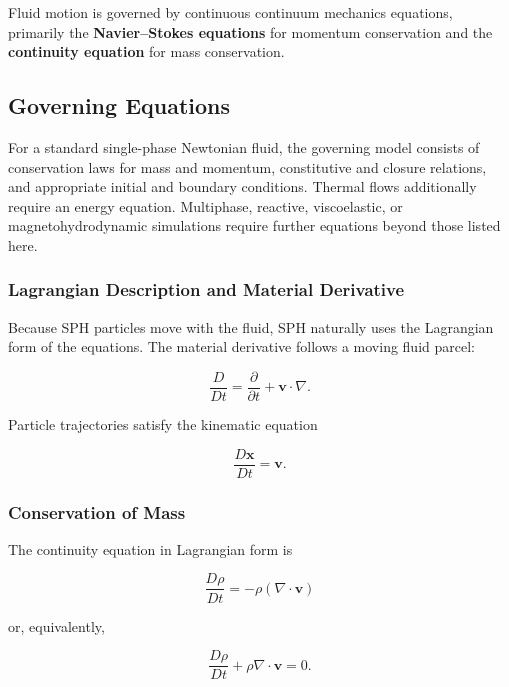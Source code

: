\documentclass[11pt]{article}
\begin{document}
Fluid motion is governed by continuous continuum mechanics equations, primarily
the \textbf{Navier--Stokes equations} for momentum conservation and the
\textbf{continuity equation} for mass conservation.

\subsection{Governing Equations}

For a standard single-phase Newtonian fluid, the governing model consists of
conservation laws for mass and momentum, constitutive and closure relations,
and appropriate initial and boundary conditions. Thermal flows additionally
require an energy equation. Multiphase, reactive, viscoelastic, or
magnetohydrodynamic simulations require further equations beyond those listed
here.

\subsubsection{Lagrangian Description and Material Derivative}

Because SPH particles move with the fluid, SPH naturally uses the Lagrangian
form of the equations. The material derivative follows a moving fluid parcel:

\begin{equation}
    \frac{D}{Dt}
    = \frac{\partial}{\partial t}
    + \mathbf{v}\cdot\nabla.
\end{equation}

Particle trajectories satisfy the kinematic equation

\begin{equation}
    \frac{D\mathbf{x}}{Dt} = \mathbf{v}.
\end{equation}

\subsubsection{Conservation of Mass}

The continuity equation in Lagrangian form is

\begin{equation}
    \frac{D\rho}{Dt} = -\rho (\nabla \cdot \mathbf{v})
\end{equation}

or, equivalently,

\begin{equation}
    \frac{D\rho}{Dt}+\rho\nabla\cdot\mathbf{v}=0.
\end{equation}
\end{document}
